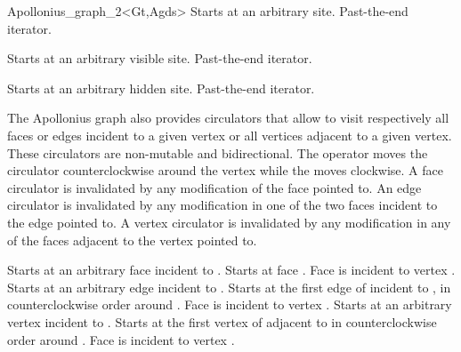 \begin{ccRefClass}{Apollonius_graph_2<Gt,Agds>}
{Starts at an arbitrary site.}
\ccGlue
{}
{Past-the-end iterator.}

{Starts at an arbitrary visible site.}
\ccGlue
{}
{Past-the-end iterator.}

{Starts at an arbitrary hidden site.}
\ccGlue
{}
{Past-the-end iterator.}


\ccThreeToTwo




The Apollonius graph also provides circulators that allow to visit 
respectively all faces or edges incident to a given vertex
or all vertices adjacent to a given vertex.
These circulators are non-mutable and bidirectional.
 The operator  moves the circulator
counterclockwise around the vertex while
the  moves clockwise.
A face circulator is invalidated by any modification of the face
pointed to.
An edge circulator is invalidated by any modification
in one of the two faces incident to the edge pointed to.
A vertex circulator is invalidated by any modification
in any of the faces adjacent to the vertex pointed to.

{Starts at an arbitrary face incident
to .}
\ccGlue
{}
{Starts at face .
\ccPrecond Face  is incident to vertex .}
\ccGlue
{}
{Starts at an arbitrary edge incident
to .}
\ccGlue
{}
{Starts at the first edge of  incident to 
, in counterclockwise order around .
\ccPrecond Face  is incident to vertex .}
\ccGlue
{}
{Starts at an arbitrary  vertex incident
to .}
\ccGlue
{}
{Starts at the first vertex of  adjacent  to 
in  counterclockwise order around .
\ccPrecond Face  is incident to vertex .}




\end{ccRefClass}
